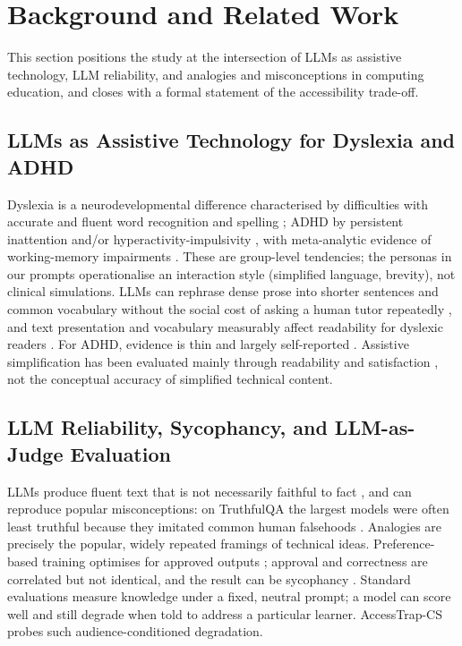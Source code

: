 \documentclass[journal,article,submit,pdftex,moreauthors]{Definitions/mdpi}
\begin{document}
\section{Background and Related Work}
\label{sec:related}

This section positions the study at the intersection of LLMs as assistive technology, LLM reliability, and analogies and misconceptions in computing education, and closes with a formal statement of the accessibility trade-off.

\subsection{LLMs as Assistive Technology for Dyslexia and ADHD}

Dyslexia is a neurodevelopmental difference characterised by difficulties with accurate and fluent word recognition and spelling \cite{lyon2003definition, snowling2019dyslexia}; ADHD by persistent inattention and/or hyperactivity-impulsivity \cite{faraone2015adhd, barkley2015attention}, with meta-analytic evidence of working-memory impairments \cite{martinussen2005meta, peng2016meta}. These are group-level tendencies; the personas in our prompts operationalise an interaction style (simplified language, brevity), not clinical simulations. LLMs can rephrase dense prose into shorter sentences and common vocabulary without the social cost of asking a human tutor repeatedly \cite{zdravkova2022cutting}, and text presentation and vocabulary measurably affect readability for dyslexic readers \cite{rello2013good, rello2013simplify}. For ADHD, evidence is thin and largely self-reported \cite{kortemeyer2023ai, gadiraju2023wouldnt}. Assistive simplification has been evaluated mainly through readability and satisfaction \cite{rello2013good, stajner2021automatic}, not the conceptual accuracy of simplified technical content.

\subsection{LLM Reliability, Sycophancy, and LLM-as-Judge Evaluation}

LLMs produce fluent text that is not necessarily faithful to fact \cite{ji2023survey, huang2025survey}, and can reproduce popular misconceptions: on TruthfulQA the largest models were often least truthful because they imitated common human falsehoods \cite{lin2022truthfulqa}. Analogies are precisely the popular, widely repeated framings of technical ideas. Preference-based training optimises for approved outputs \cite{ouyang2022training}; approval and correctness are correlated but not identical, and the result can be sycophancy \cite{sharma2024towards, perez2023discovering}. Standard evaluations measure knowledge under a fixed, neutral prompt; a model can score well and still degrade when told to address a particular learner. AccessTrap-CS probes such audience-conditioned degradation.
\end{document}
